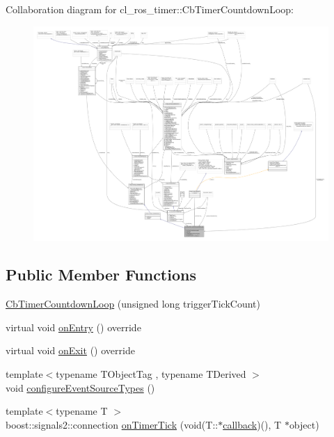 Collaboration diagram for cl\+\_\+ros\+\_\+timer\+:\+:Cb\+Timer\+Countdown\+Loop\+:
\nopagebreak
\begin{figure}[H]
\begin{center}
\leavevmode
\includegraphics[width=350pt]{classcl__ros__timer_1_1CbTimerCountdownLoop__coll__graph}
\end{center}
\end{figure}
\subsection*{Public Member Functions}
\begin{DoxyCompactItemize}
\item 
\hyperlink{classcl__ros__timer_1_1CbTimerCountdownLoop_a8cdfe250d9469ea019b61051be123195}{Cb\+Timer\+Countdown\+Loop} (unsigned long trigger\+Tick\+Count)
\item 
virtual void \hyperlink{classcl__ros__timer_1_1CbTimerCountdownLoop_aa088f15db4fb2c307c86b30b2e1f7744}{on\+Entry} () override
\item 
virtual void \hyperlink{classcl__ros__timer_1_1CbTimerCountdownLoop_a5623e9fdd8f0fb23e8707f7816c099d6}{on\+Exit} () override
\item 
{\footnotesize template$<$typename T\+Object\+Tag , typename T\+Derived $>$ }\\void \hyperlink{classcl__ros__timer_1_1CbTimerCountdownLoop_a8672075f8a3cbf4ef3f50af0eed8fa53}{configure\+Event\+Source\+Types} ()
\item 
{\footnotesize template$<$typename T $>$ }\\boost\+::signals2\+::connection \hyperlink{classcl__ros__timer_1_1CbTimerCountdownLoop_ad251cc8444ca7070f64658bbb77e1275}{on\+Timer\+Tick} (void(T\+::$\ast$\hyperlink{3_2servers_2opencv__perception__node_2opencv__perception__node_8cpp_a050e697bd654facce10ea3f6549669b3}{callback})(), T $\ast$object)
\end{DoxyCompactItemize}
